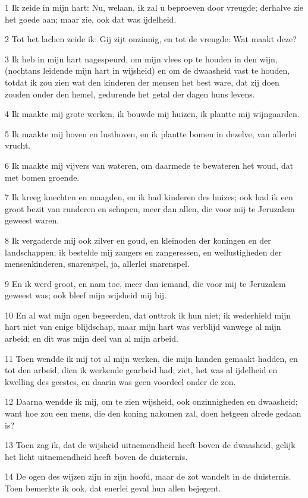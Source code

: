 \par 1 Ik zeide in mijn hart: Nu, welaan, ik zal u beproeven door vreugde; derhalve zie het goede aan; maar zie, ook dat was ijdelheid.
\par 2 Tot het lachen zeide ik: Gij zijt onzinnig, en tot de vreugde: Wat maakt deze?
\par 3 Ik heb in mijn hart nagespeurd, om mijn vlees op te houden in den wijn, (nochtans leidende mijn hart in wijsheid) en om de dwaasheid vast te houden, totdat ik zou zien wat den kinderen der mensen het best ware, dat zij doen zouden onder den hemel, gedurende het getal der dagen huns levens.
\par 4 Ik maakte mij grote werken, ik bouwde mij huizen, ik plantte mij wijngaarden.
\par 5 Ik maakte mij hoven en lusthoven, en ik plantte bomen in dezelve, van allerlei vrucht.
\par 6 Ik maakte mij vijvers van wateren, om daarmede te bewateren het woud, dat met bomen groende.
\par 7 Ik kreeg knechten en maagden, en ik had kinderen des huizes; ook had ik een groot bezit van runderen en schapen, meer dan allen, die voor mij te Jeruzalem geweest waren.
\par 8 Ik vergaderde mij ook zilver en goud, en kleinoden der koningen en der landschappen; ik bestelde mij zangers en zangeressen, en wellustigheden der mensenkinderen, snarenspel, ja, allerlei snarenspel.
\par 9 En ik werd groot, en nam toe, meer dan iemand, die voor mij te Jeruzalem geweest was; ook bleef mijn wijsheid mij bij.
\par 10 En al wat mijn ogen begeerden, dat onttrok ik hun niet; ik wederhield mijn hart niet van enige blijdschap, maar mijn hart was verblijd vanwege al mijn arbeid; en dit was mijn deel van al mijn arbeid.
\par 11 Toen wendde ik mij tot al mijn werken, die mijn handen gemaakt hadden, en tot den arbeid, dien ik werkende gearbeid had; ziet, het was al ijdelheid en kwelling des geestes, en daarin was geen voordeel onder de zon.
\par 12 Daarna wendde ik mij, om te zien wijsheid, ook onzinnigheden en dwaasheid; want hoe zou een mens, die den koning nakomen zal, doen hetgeen alrede gedaan is?
\par 13 Toen zag ik, dat de wijsheid uitnemendheid heeft boven de dwaasheid, gelijk het licht uitnemendheid heeft boven de duisternis.
\par 14 De ogen des wijzen zijn in zijn hoofd, maar de zot wandelt in de duisternis. Toen bemerkte ik ook, dat enerlei geval hun allen bejegent.
